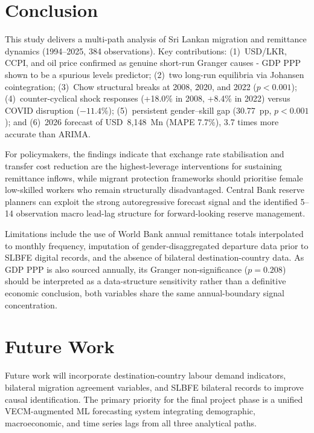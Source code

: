 \documentclass[sigconf]{acmart}
\begin{document}
\section{Conclusion}

This study delivers a multi-path analysis of Sri Lankan migration and remittance dynamics (1994--2025, 384 observations). Key contributions: (1)~USD/LKR, CCPI, and oil price confirmed as genuine short-run Granger causes - GDP PPP shown to be a spurious levels predictor; (2)~two long-run equilibria via Johansen cointegration; (3)~Chow structural breaks at 2008, 2020, and 2022 ($p<0.001$); (4)~counter-cyclical shock responses (+18.0\% in 2008, +8.4\% in 2022) versus COVID disruption ($-11.4\%$); (5)~persistent gender--skill gap (30.77~pp, $p<0.001$); and (6)~2026 forecast of USD~8,148~Mn (MAPE 7.7\%), 3.7 times more accurate than ARIMA.

For policymakers, the findings indicate that exchange rate stabilisation and transfer cost reduction are the highest-leverage interventions for sustaining remittance inflows, while migrant protection frameworks should prioritise female low-skilled workers who remain structurally disadvantaged. Central Bank reserve planners can exploit the strong autoregressive forecast signal and the identified 5--14 observation macro lead-lag structure for forward-looking reserve management. 

Limitations include the use of World Bank annual remittance totals interpolated to monthly frequency, imputation of gender-disaggregated departure data prior to SLBFE digital records, and the absence of bilateral destination-country data. As GDP PPP is also sourced annually, its Granger non-significance ($p=0.208$) should be interpreted as a data-structure sensitivity rather than a definitive economic conclusion, both variables share the same annual-boundary signal concentration. 

\section{Future Work}
Future work will incorporate destination-country labour demand indicators, bilateral migration agreement variables, and SLBFE bilateral records to improve causal identification. The primary priority for the final project phase is a unified VECM-augmented ML forecasting system integrating demographic, macroeconomic, and time series lags from all three analytical paths.
\end{document}

